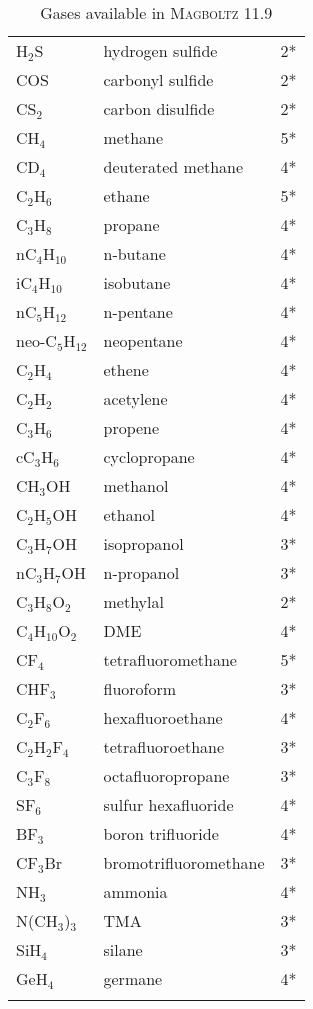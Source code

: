 \begin{appendix}
\begin{longtable}{l l l}
  H\(_{2}\)S & hydrogen sulfide & 2* \\
  COS        & carbonyl sulfide & 2* \\
  CS\(_{2}\) & carbon disulfide & 2* \\
  \midrule
  CH\(_{4}\)           & methane   & 5* \\
  CD\(_{4}\)           & deuterated methane & 4* \\
  C\(_{2}\)H\(_{6}\)   & ethane    & 5* \\
  C\(_{3}\)H\(_{8}\)   & propane   & 4* \\
  nC\(_{4}\)H\(_{10}\) & n-butane  & 4* \\
  iC\(_{4}\)H\(_{10}\) & isobutane & 4* \\ 
  nC\(_{5}\)H\(_{12}\) & n-pentane & 4* \\  
  neo-C\(_{5}\)H\(_{12}\) & neopentane & 4* \\
  C\(_{2}\)H\(_{4}\)   & ethene    & 4* \\
  C\(_{2}\)H\(_{2}\)   & acetylene & 4* \\
  C\(_{3}\)H\(_{6}\)   & propene   & 4* \\
  cC\(_{3}\)H\(_{6}\)   & cyclopropane & 4* \\
  \midrule
  CH\(_{3}\)OH         & methanol        & 4* \\
  C\(_{2}\)H\(_{5}\)OH & ethanol         & 4* \\
  C\(_{3}\)H\(_{7}\)OH & isopropanol     & 3* \\
  nC\(_{3}\)H\(_{7}\)OH & n-propanol     & 3* \\
  C\(_{3}\)H\(_{8}\)O\(_{2}\)  & methylal & 2* \\
  C\(_{4}\)H\(_{10}\)O\(_{2}\) & DME      & 4* \\
  \midrule
  CF\(_{4}\)           & tetrafluoromethane & 5* \\
  CHF\(_{3}\)          & fluoroform         & 3* \\
  C\(_{2}\)F\(_{6}\)   & hexafluoroethane   & 4* \\
  C\(_{2}\)H\(_{2}\)F\(_{4}\) & tetrafluoroethane & 3* \\
  C\(_{3}\)F\(_{8}\)   & octafluoropropane  & 3* \\
  SF\(_{6}\)           & sulfur hexafluoride  & 4* \\
  BF\(_{3}\)           & boron trifluoride    & 4* \\ 
  CF\(_{3}\)Br         & bromotrifluoromethane & 3* \\
  \midrule
  NH\(_{3}\)            & ammonia  & 4* \\
  N(CH\(_{3}\))\(_{3}\) & TMA      & 3* \\
  SiH\(_{4}\)           & silane   & 3* \\
  GeH\(_{4}\)           & germane  & 4* \\
  \bottomrule
  \caption{Gases available in \textsc{Magboltz} 11.9} 
  \label{Tab:GasesMagboltz11}
\end{longtable}


\end{appendix}

